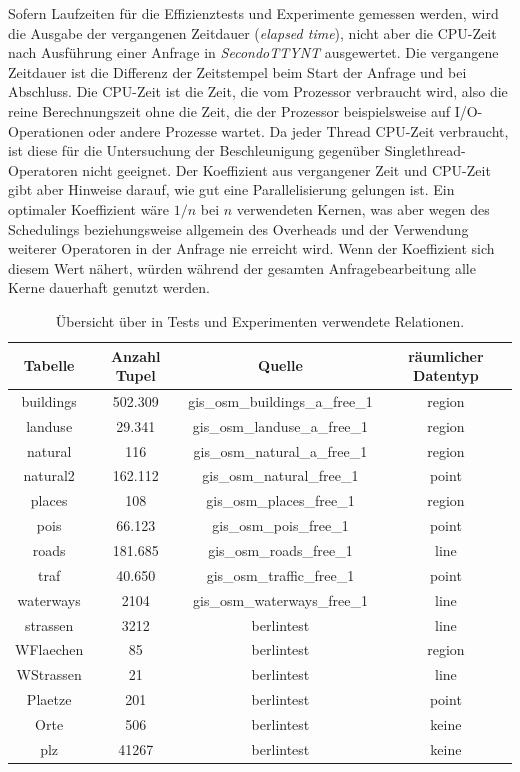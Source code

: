 \documentclass[a4paper,12pt,twoside]{article}
\newcommand{\Fb}[1]{\textit{#1}} %
\begin{document}
Sofern Laufzeiten für die Effizienztests und Experimente gemessen werden, wird die Ausgabe der vergangenen Zeitdauer (\Fb{elapsed time}), nicht aber die CPU-Zeit nach Ausführung einer Anfrage in \Fb{SecondoTTYNT} ausgewertet. Die vergangene Zeitdauer ist die Differenz der Zeitstempel beim Start der Anfrage und bei Abschluss. Die CPU-Zeit ist die Zeit, die vom Prozessor verbraucht wird, also die reine Berechnungszeit ohne die Zeit, die der Prozessor beispielsweise auf I/O-Operationen oder andere Prozesse wartet. Da jeder Thread CPU-Zeit verbraucht, ist diese für die Untersuchung der Beschleunigung gegenüber Singlethread-Operatoren nicht geeignet. Der Koeffizient aus vergangener Zeit und CPU-Zeit gibt aber Hinweise darauf, wie gut eine Parallelisierung gelungen ist. Ein optimaler Koeffizient wäre $1 / n$ bei $n$ verwendeten Kernen, was aber wegen des Schedulings beziehungsweise allgemein des Overheads und der Verwendung weiterer Operatoren in der Anfrage nie erreicht wird. Wenn der Koeffizient sich diesem Wert nähert, würden während der gesamten Anfragebearbeitung alle Kerne dauerhaft genutzt werden.

\begin{table}
	\centering
\begin{tabular}{|c|c|c|c|}
	\hline
	\rowcolor{gray!30}
	Tabelle & Anzahl Tupel & Quelle & räumlicher Datentyp  \\ 
	\hline 
	buildings & 502.309 & gis\_osm\_buildings\_a\_free\_1 & region \\ 
	\hline 
	landuse & 29.341 & gis\_osm\_landuse\_a\_free\_1 & region \\ 
	\hline 
	natural & 116 & gis\_osm\_natural\_a\_free\_1 & region \\ 
	\hline 
	natural2 & 162.112 & gis\_osm\_natural\_free\_1 & point \\ 
	\hline
	places & 108 & gis\_osm\_places\_free\_1 & region \\ 
	\hline 
	pois & 66.123 & gis\_osm\_pois\_free\_1  & point \\ 
	\hline 
	roads & 181.685 & gis\_osm\_roads\_free\_1 & line \\ 
	\hline
	traf & 40.650 & gis\_osm\_traffic\_free\_1  & point \\ 
	\hline 
	waterways & 2104 & gis\_osm\_waterways\_free\_1 & line \\ 
	\hline
	strassen & 3212 &  berlintest & line \\ 
	\hline
	WFlaechen & 85 &  berlintest & region \\ 
	\hline 
	WStrassen & 21 &  berlintest & line \\ 
	\hline 
	Plaetze & 201 &  berlintest & point \\ 
	\hline 
	Orte & 506 & berlintest & keine \\ 
	\hline
	plz & 41267 & berlintest & keine \\ 
	\hline 
\end{tabular}
\caption{\label{tab:testRel} Übersicht über in Tests und Experimenten verwendete Relationen.}
\end{table}
\end{document}
